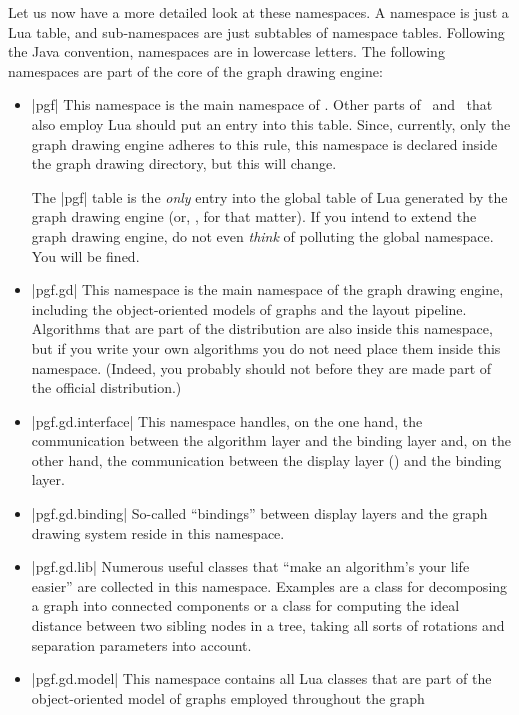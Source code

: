 Let us now have a more detailed look at these namespaces. A namespace is just a
Lua table, and sub-namespaces are just subtables of namespace tables. Following
the Java convention, namespaces are in lowercase letters. The following
namespaces are part of the core of the graph drawing engine:
%
\begin{itemize}
    \item |pgf| This namespace is the main namespace of \pgfname. Other parts
        of \pgfname\ and \tikzname\ that also employ Lua should put an entry
        into this table. Since, currently, only the graph drawing engine
        adheres to this rule, this namespace is declared inside the graph
        drawing directory, but this will change.

        The |pgf| table is the \emph{only} entry into the global table of Lua
        generated by the graph drawing engine (or, \pgfname, for that matter).
        If you intend to extend the graph drawing engine, do not even
        \emph{think} of polluting the global namespace. You will be fined.
    \item |pgf.gd| This namespace is the main namespace of the graph drawing
        engine, including the object-oriented models of graphs and the layout
        pipeline. Algorithms that are part of the distribution are also inside
        this namespace, but if you write your own algorithms you do not need
        place them inside this namespace. (Indeed, you probably should not
        before they are made part of the official distribution.)
    \item |pgf.gd.interface| This namespace handles, on the one hand, the
        communication between the algorithm layer and the binding layer and, on
        the other hand, the communication between the display layer (\tikzname)
        and the binding layer.
    \item |pgf.gd.binding| So-called ``bindings'' between display layers and
        the graph drawing system reside in this namespace.
    \item |pgf.gd.lib| Numerous useful classes that ``make an algorithm's your
        life easier'' are collected in this namespace. Examples are a class for
        decomposing a graph into connected components or a class for computing
        the ideal distance between two sibling nodes in a tree, taking all
        sorts of rotations and separation parameters into account.
    \item |pgf.gd.model| This namespace contains all Lua classes that are part
        of the object-oriented model of graphs employed throughout the graph

\end{itemize}
